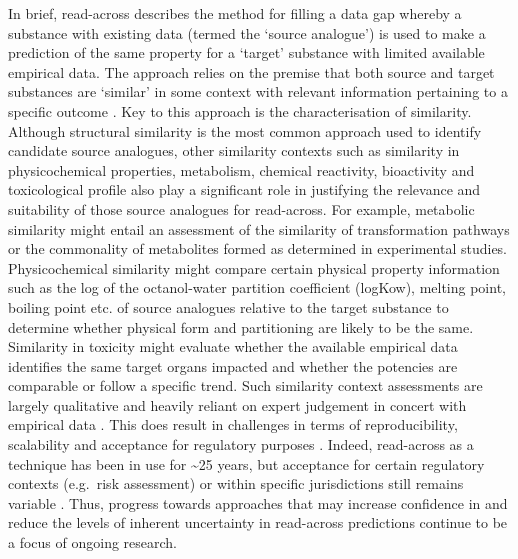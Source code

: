 \documentclass[
  super,
  preprint,
  3p]{elsarticle}
\begin{document}
In brief, read-across describes the method for filling a data gap
whereby a substance with existing data (termed the `source analogue') is
used to make a prediction of the same property for a `target' substance
with limited available empirical data. The approach relies on the
premise that both source and target substances are `similar' in some
context with relevant information pertaining to a specific outcome
\citep{enoch_chemical_2010, oecd_guidance_2014}. Key to this approach is
the characterisation of similarity. Although structural similarity is
the most common approach used to identify candidate source analogues,
other similarity contexts such as similarity in physicochemical
properties, metabolism, chemical reactivity, bioactivity and
toxicological profile also play a significant role in justifying the
relevance and suitability of those source analogues for read-across. For
example, metabolic similarity might entail an assessment of the
similarity of transformation pathways or the commonality of metabolites
formed as determined in experimental studies. Physicochemical similarity
might compare certain physical property information such as the log of
the octanol-water partition coefficient (logKow), melting point, boiling
point etc. of source analogues relative to the target substance to
determine whether physical form and partitioning are likely to be the
same. Similarity in toxicity might evaluate whether the available
empirical data identifies the same target organs impacted and whether
the potencies are comparable or follow a specific trend. Such similarity
context assessments are largely qualitative and heavily reliant on
expert judgement in concert with empirical data
\citep{patlewicz_building_2015}. This does result in challenges in terms
of reproducibility, scalability and acceptance for regulatory purposes
\citep{shah_systematically_2016}. Indeed, read-across as a technique has
been in use for \textasciitilde25 years, but acceptance for certain
regulatory contexts (e.g.~risk assessment) or within specific
jurisdictions still remains variable \citep{patlewicz_towards_2023}.
Thus, progress towards approaches that may increase confidence in and
reduce the levels of inherent uncertainty in read-across predictions
continue to be a focus of ongoing research.
\end{document}
